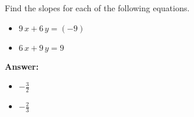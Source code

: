  Find the slopes for each of the following equations. \begin{itemize}\item \( 9 \, x + 6 \, y = \left(-9\right) \)\item \( 6 \, x + 9 \, y = 9 \)\end{itemize}

        \textbf{Answer:} \begin{itemize}\item \( -\frac{3}{2} \)\item \( -\frac{2}{3} \)\end{itemize}
